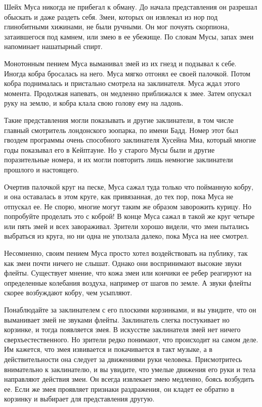 \documentclass[12pt,a4paper,twoside,openany,svgnames]{memoir}
\begin{document}
Шейх Муса никогда не прибегал к обману. До начала представления он разрешал обыскать и даже раздеть себя. Змеи, которых он извлекал из нор под глинобитными хижинами, не были ручными. Он мог почуять скорпиона, затаившегося под камнем, или змею в ее убежище. По словам Мусы, запах змеи напоминает нашатырный спирт.

Монотонным пением Муса выманивал змей из их гнезд и подзывал к себе. Иногда кобра бросалась на него. Муса мягко отгонял ее своей палочкой. Потом кобра поднималась и пристально смотрела на заклинателя. Муса ждал этого момента. Продолжая напевать, он медленно приближался к змее. Затем опускал руку на землю, и кобра клала свою голову ему на ладонь.

Такие представления могли показывать и другие заклинатели, в том числе главный смотритель лондонского зоопарка, по имени Бадд. Номер этот был гвоздем программы очень способного заклинателя Хусейна Миа, который многие годы показывал его в Кейптауне. Но у старого Мусы были и другие поразительные номера, и их могли повторить лишь немногие заклинатели прошлого и настоящего.

Очертив палочкой круг на песке, Муса сажал туда только что пойманную кобру, и она оставалась в этом круге, как привязанная, до тех пор, пока Муса не отпускал ее. Не спорю, многие могут таким же образом заворожить курицу. Но попробуйте проделать это с коброй! В конце Муса сажал в такой же круг четыре или пять змей и всех завораживал. Зрители хорошо видели, что змеи пытались выбраться из круга, но ни одна не уползала далеко, пока Муса на нее смотрел.

Несомненно, своим пением Муса просто хотел воздействовать на публику, так как змеи почти ничего не слышат. Однако они воспринимают высокие звуки флейты. Существует мнение, что кожа змеи или кончики ее ребер реагируют на определенные колебания воздуха, например от шагов по земле. А звуки флейты скорее возбуждают кобру, чем усыпляют.

Понаблюдайте за заклинателем с его плоскими корзинками, и вы увидите, что он выманивает змей не звуками флейты. Заклинатель слегка постукивает но корзинке, и тогда появляется змея. В искусстве заклинателя змей нет ничего сверхъестественного. Но зрители редко понимают, что происходит на самом деле. Им кажется, что змея извивается и покачивается в такт музыке, а в действительности она следует за движениями руки человека. Присмотритесь внимательно к заклинателю, и вы увидите, что умелые движения его руки и тела направляют действия змеи. Он всегда извлекает змею медленно, боясь возбудить ее. Если же змея проявляет признаки раздражения, он кладет ее обратно в корзинку и выбирает для представления другую.
\end{document}
